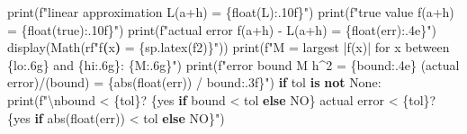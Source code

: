 \documentclass[
  letterpaper,
  DIV=11,
  numbers=noendperiod]{scrreprt}
\newenvironment{Shaded}{\begin{snugshade}}{\end{snugshade}}
\newcommand{\BuiltInTok}[1]{\textcolor[rgb]{0.00,0.23,0.31}{#1}}
\newcommand{\CharTok}[1]{\textcolor[rgb]{0.13,0.47,0.30}{#1}}
\newcommand{\ControlFlowTok}[1]{\textcolor[rgb]{0.00,0.23,0.31}{\textbf{#1}}}
\newcommand{\KeywordTok}[1]{\textcolor[rgb]{0.00,0.23,0.31}{\textbf{#1}}}
\newcommand{\NormalTok}[1]{\textcolor[rgb]{0.00,0.23,0.31}{#1}}
\newcommand{\OperatorTok}[1]{\textcolor[rgb]{0.37,0.37,0.37}{#1}}
\newcommand{\SpecialCharTok}[1]{\textcolor[rgb]{0.37,0.37,0.37}{#1}}
\newcommand{\SpecialStringTok}[1]{\textcolor[rgb]{0.13,0.47,0.30}{#1}}
\newcommand{\StringTok}[1]{\textcolor[rgb]{0.13,0.47,0.30}{#1}}
\newcommand{\VariableTok}[1]{\textcolor[rgb]{0.07,0.07,0.07}{#1}}
\newcommand{\VerbatimStringTok}[1]{\textcolor[rgb]{0.13,0.47,0.30}{#1}}
\theoremstyle{plain}
\theoremstyle{plain}
\theoremstyle{definition}
\theoremstyle{definition}
\theoremstyle{definition}
\theoremstyle{plain}
\theoremstyle{plain}
\theoremstyle{remark}
\begin{document}
\begin{Shaded}
\begin{Highlighting}[]
    \BuiltInTok{print}\NormalTok{(}\SpecialStringTok{f"linear approximation L(a+h) = }\SpecialCharTok{\{}\BuiltInTok{float}\NormalTok{(L)}\SpecialCharTok{:.10f\}}\SpecialStringTok{"}\NormalTok{)}
    \BuiltInTok{print}\NormalTok{(}\SpecialStringTok{f"true value         f(a+h) = }\SpecialCharTok{\{}\BuiltInTok{float}\NormalTok{(true)}\SpecialCharTok{:.10f\}}\SpecialStringTok{"}\NormalTok{)}
    \BuiltInTok{print}\NormalTok{(}\SpecialStringTok{f"actual error  f(a+h) {-} L(a+h) = }\SpecialCharTok{\{}\BuiltInTok{float}\NormalTok{(err)}\SpecialCharTok{:.4e\}}\SpecialStringTok{"}\NormalTok{)}
\NormalTok{    display(Math(}\VerbatimStringTok{rf"f\textquotesingle{}\textquotesingle{}}\KeywordTok{(}\VerbatimStringTok{x}\KeywordTok{)}\VerbatimStringTok{ = }\SpecialCharTok{\{}\NormalTok{sp}\SpecialCharTok{.}\NormalTok{latex(f2)}\SpecialCharTok{\}}\VerbatimStringTok{"}\NormalTok{))}
    \BuiltInTok{print}\NormalTok{(}\SpecialStringTok{f"M = largest |f\textquotesingle{}\textquotesingle{}(x)| for x between }\SpecialCharTok{\{}\NormalTok{lo}\SpecialCharTok{:.6g\}}\SpecialStringTok{ and }\SpecialCharTok{\{}\NormalTok{hi}\SpecialCharTok{:.6g\}}\SpecialStringTok{:  }\SpecialCharTok{\{}\NormalTok{M}\SpecialCharTok{:.6g\}}\SpecialStringTok{"}\NormalTok{)}
    \BuiltInTok{print}\NormalTok{(}\SpecialStringTok{f"error bound M h\^{}2 = }\SpecialCharTok{\{}\NormalTok{bound}\SpecialCharTok{:.4e\}}\SpecialStringTok{      (actual error)/(bound) = }\SpecialCharTok{\{}\BuiltInTok{abs}\NormalTok{(}\BuiltInTok{float}\NormalTok{(err)) }\OperatorTok{/}\NormalTok{ bound}\SpecialCharTok{:.3f\}}\SpecialStringTok{"}\NormalTok{)}
    \ControlFlowTok{if}\NormalTok{ tol }\KeywordTok{is} \KeywordTok{not} \VariableTok{None}\NormalTok{:}
        \BuiltInTok{print}\NormalTok{(}\SpecialStringTok{f"}\CharTok{\textbackslash{}n}\SpecialStringTok{bound \textless{} }\SpecialCharTok{\{}\NormalTok{tol}\SpecialCharTok{\}}\SpecialStringTok{?  }\SpecialCharTok{\{}\StringTok{\textquotesingle{}yes\textquotesingle{}} \ControlFlowTok{if}\NormalTok{ bound }\OperatorTok{\textless{}}\NormalTok{ tol }\ControlFlowTok{else} \StringTok{\textquotesingle{}NO\textquotesingle{}}\SpecialCharTok{\}}\SpecialStringTok{      actual error \textless{} }\SpecialCharTok{\{}\NormalTok{tol}\SpecialCharTok{\}}\SpecialStringTok{?  }\SpecialCharTok{\{}\StringTok{\textquotesingle{}yes\textquotesingle{}} \ControlFlowTok{if} \BuiltInTok{abs}\NormalTok{(}\BuiltInTok{float}\NormalTok{(err)) }\OperatorTok{\textless{}}\NormalTok{ tol }\ControlFlowTok{else} \StringTok{\textquotesingle{}NO\textquotesingle{}}\SpecialCharTok{\}}\SpecialStringTok{"}\NormalTok{)}



\end{Highlighting}
\end{Shaded}
\end{document}
